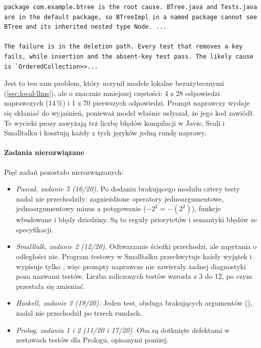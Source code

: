 \begin{lstlisting}[style=prompt,caption={Początek dwóch odpowiedzi naprawczych, które zostały zapisane jako pliki źródłowe (Java, zadanie 9; Smalltalk, zadanie 9; linie skrócone).},label={lst:leak}]
package com.example.btree is the root cause. BTree.java and Tests.java are in the default package, so BTreeImpl in a named package cannot see BTree and its inherited nested type Node. ...

The failure is in the deletion path. Every test that removes a key fails, while insertion and the absent-key test pass. The likely cause is `OrderedCollection>>...
\end{lstlisting}

Jest to ten sam problem, który uczynił modele lokalne bezużytecznymi (\cref{sec:local-llms}), ale
o znacznie mniejszej częstości: 4 z 28 odpowiedzi naprawczych (14\,\%) i 1 z 70 pierwszych
odpowiedzi. Prompt naprawczy wydaje się skłaniać do wyjaśnień, ponieważ model właśnie usłyszał, że
jego kod zawiódł. Te wycieki prozy zawyżają też liczbę błędów kompilacji w Javie, Scali i Smalltalku
i kosztują każdy z tych języków jedną rundę naprawy.

\paragraph{Zadania nierozwiązane} Pięć zadań pozostało nierozwiązanych:
\begin{itemize}
  \item \emph{Pascal, zadanie 5 (16/20).} Po dodaniu brakującego modułu cztery testy nadal nie
    przechodziły: zagnieżdżone operatory jednoargumentowe, jednoargumentowy minus a potęgowanie
    ($-2^2 = -(2^2)$), funkcje wbudowane i błędy dziedziny. Są to reguły priorytetów i semantyki
    błędów ze specyfikacji.
  \item \emph{Smalltalk, zadanie 2 (12/20).} Odtwarzanie ścieżki przechodzi, ale zapytania
    o odległości nie. Program testowy w Smalltalku przechwytuje każdy wyjątek i wypisuje tylko
    \code{[FAIL]}, więc prompty naprawcze nie zawierały żadnej diagnostyki poza nazwami testów.
    Liczba zaliczonych testów wzrosła z 3 do 12, po czym przestała się zmieniać.
  \item \emph{Haskell, zadanie 3 (19/20).} Jeden test, obsługa brakujących argumentów
    (), nadal nie przechodził po trzech rundach.
  \item \emph{Prolog, zadania 1 i 2 (11/20 i 17/20).} Oba są dotknięte defektami w zestawach testów
    dla Prologu, opisanymi poniżej.
\end{itemize}

